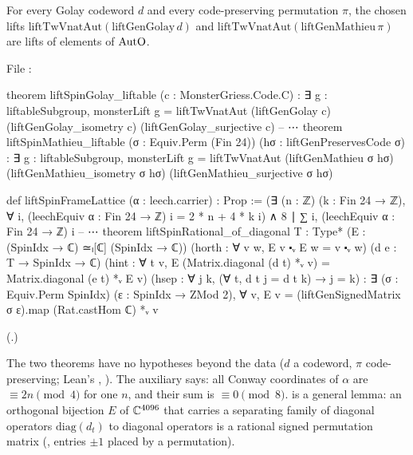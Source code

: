 \begin{theorem}\label{ch22:thm:monomial}
For every Golay codeword $d$ and every code-preserving permutation $\pi$, the chosen lifts
$\mathrm{liftTwVnatAut}(\mathrm{liftGenGolay}\,d)$ and $\mathrm{liftTwVnatAut}(\mathrm{liftGenMathieu}\,\pi)$ are lifts of
elements of $\mathrm{AutO}$.
\end{theorem}
\noindent File :
\begin{leancode}
theorem liftSpinGolay_liftable (c : MonsterGriess.Code.C) :
    ∃ g : liftableSubgroup, monsterLift g =
      liftTwVnatAut (liftGenGolay c) (liftGenGolay_isometry c) (liftGenGolay_surjective c)
-- ⋯
theorem liftSpinMathieu_liftable (σ : Equiv.Perm (Fin 24)) (hσ : liftGenPreservesCode σ) :
    ∃ g : liftableSubgroup, monsterLift g = liftTwVnatAut (liftGenMathieu σ hσ)
      (liftGenMathieu_isometry σ hσ) (liftGenMathieu_surjective σ hσ)
\end{leancode}
\begin{leancode}
def liftSpinFrameLattice (α : leech.carrier) : Prop :=
  (∃ (n : ℤ) (k : Fin 24 → ℤ),
    ∀ i, (leechEquiv α : Fin 24 → ℤ) i = 2 * n + 4 * k i) ∧
    8 ∣ ∑ i, (leechEquiv α : Fin 24 → ℤ) i
-- ⋯
theorem liftSpinRational_of_diagonal {T : Type*} (E : (SpinIdx → ℂ) ≃ₗ[ℂ] (SpinIdx → ℂ))
    (horth : ∀ v w, E v ⬝ᵥ E w = v ⬝ᵥ w)
    (d e : T → SpinIdx → ℂ)
    (hint : ∀ t v, E (Matrix.diagonal (d t) *ᵥ v) =
      Matrix.diagonal (e t) *ᵥ E v)
    (hsep : ∀ j k, (∀ t, d t j = d t k) → j = k) :
    ∃ (σ : Equiv.Perm SpinIdx) (ε : SpinIdx → ZMod 2),
      ∀ v, E v = (liftGenSignedMatrix σ ε).map (Rat.castHom ℂ) *ᵥ v
\end{leancode}
(.)
\begin{dictionary}
The two theorems have no hypotheses beyond the data ($d$ a codeword, $\pi$ code-preserving; Lean's , ).  The auxiliary
 says: all Conway coordinates of $\alpha$ are $\equiv2n\pmod4$ for one $n$, and their sum
is $\equiv0\pmod8$.   is a general lemma: an orthogonal bijection $E$ of ${\mathbb{C}}^{4096}$
that carries a separating family of diagonal operators $\mathrm{diag}(d_t)$ to diagonal operators is a rational signed
permutation matrix (, entries $\pm1$ placed by a permutation).
\end{dictionary}
